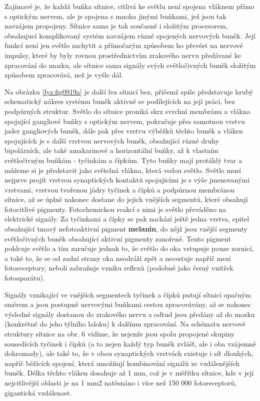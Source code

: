     Zajímavé je, že každá buňka sítnice, citlivá ke světlu není spojena vláknem přímo s optickým
    nervem, ale je spojena s mnoha jinými buňkami, jež jsou tak navzájem propojeny. Sítnice sama je
    tak současně i složitým procesorem, obsahujucí komplikovaný systém navzájem různě spojených
    nervových buněk. Její funkcí není jen světlo zachytit a přímočarým způsobem ho převést na
    nervové impulsy, které by byly rovnou prostřednictvím zrakového nervu předávané ke zpracování do
    mozku, ale sítnice sama signály svých světločivných buněk složitým způsobem zpracovává, než je
    vyšle dál. 
    
    Na obrázku \ref{fyz:fig0919a} je další řez sítnicí bez, přičemž spíše představuje hrubý
    schematický nákres systému buněk aktivně se podílejících na její práci, bez podpůrných struktur.
    Světlo do sítnice proniká skrz svrchní membránu a vlákna spojující gangliové buňky s optickým
    nervem, pokračuje přes samotnou vrstvu jader gangliových buněk, dále pak přes vrstvu výběžků
    těchto buněk a vláken spojujících je s další vrstvou nervových buněk, obsahující různé druhy
    bipolárních, ale také amakarinové a horizontální buňky, až k vlastním světločivným buňkám -
    tyčinkám a čípkům. Tyto buňky mají protáhlý tvar a můžeme si je představit jako světelná vlákna,
    která vedou světlo. Světlo musí nejprve projít vrstvou synaptických kontaktů spojujícími je s
    výše jmenovanými vrstvami, vrstvou tvořenou jádry tyčinek a čípků a podpůrnou membránou sítnice,
    až se úplně nakonec dostane do jejich vnějších segmentů, které obsahují fotocitlivé pigmenty.
    Fotochemickou reakcí s nimi je světlo převáděno na elektrické signály. Za tyčinkami a čípky se
    pak nachází ještě jedna vrstva, epitel obsahující tmavý nefotoaktivní pigment \textbf{melanin},
    do nějž jsou vnější segmenty světločivných buněk obsahující aktivní pigmenty zanořené. Tento
    pigment pohlcuje světlo a tím zaručuje jednak to, že světlo do oka vstupuje pouze zornicí, a
    také to, že se od zadní strany oka neodráží zpět a necestuje napříč mezi fotoreceptory, neboli
    zabraňuje vzniku reflexů (podobně jako černý vnitřek fotoaparátu).

    Signály vznikající ve vnějších segmentech tyčinek a čípků putují sítnicí opačným směrem a jsou
    postupně nervovými buňkami cestou zpracovávány, až se nakonec výsledné signály dostanou do
    zrakového nervu a odtud jsou předány až do mozku (konkrétně do jeho týlního laloku) k dalšímu
    zpracování. Na schématu nervové struktury sítnice na obr. 6 vidíme, že nejenže jsou spolu
    propojené skupiny sousedících tyčinek i čípků (a to nejen každý typ buněk zvlášť, ale i oba
    vzájemně dohromady), ale také to, že v obou synaptických vrstvách existuje i síť dlouhých,
    napříč běžících spojení, která umožňují kombinování signálů ze vzdálenějších buněk. Délka těchto
    vláken dosahuje až 1 mm, což je v měřítku sítnice, kde v její nejcitlivější oblasti je na 1 mm2
    natěsnáno i více než 150 000 fotoreceptorů, gigantická vzdálenost.

